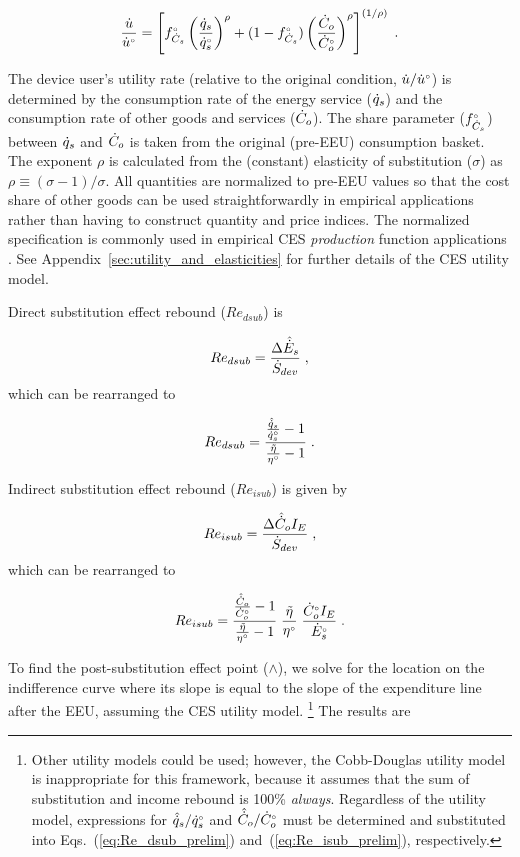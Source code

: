 \documentclass[12pt]{article}\usepackage[]{graphicx}\usepackage[]{xcolor}
\begin{document}
\begin{equation} \label{eq:ces_utility}
  \frac{\dot{u}}{{}{\dot{u}}^{\scriptscriptstyle \circ}} = \left[ {}{f}^{\scriptscriptstyle \circ}_{\dot{C}_s} \left( \frac{\dot{q}_s}{{}{\dot{q}}^{\scriptscriptstyle \circ}_s} \right)^\rho + (1-{}{f}^{\scriptscriptstyle \circ}_{\dot{C}_s}) \left( \frac{\dot{C}_o}{{}{\dot{C}}^{\scriptscriptstyle \circ}_o} \right)^\rho \right]^{(1/\rho)}{} \; .
\end{equation}

The device user's utility rate
(relative to the original condition, $\dot{u}/{}{\dot{u}}^{\scriptscriptstyle \circ}$)
is determined by
the consumption rate of the energy service ($\dot{q}_s$) and
the consumption rate of other goods and services ($\dot{C}_o$).
The share parameter (${}{f}^{\scriptscriptstyle \circ}_{\dot{C}_s}$) 
between $\dot{q}_s$ and $\dot{C}_o$
is taken from the original (pre-EEU) consumption basket.
The exponent $\rho$ is calculated from the (constant) 
elasticity of substitution ($\sigma$) 
as $\rho \equiv (\sigma - 1)/\sigma$.
All quantities are normalized to pre-EEU values so that
the cost share of other goods can be used straightforwardly 
in empirical applications rather than having
to construct quantity and price indices.
The normalized specification is commonly used in empirical CES \emph{production}
function applications \citep{Klump2012,Temple2012,Gechert2021}.
See Appendix~\ref{sec:utility_and_elasticities}
for further details of the CES utility model.

Direct substitution effect rebound ($Re_{dsub}$) is

\begin{equation} \label{eq:Re_dsub_def}
  Re_{dsub} = \frac{\Delta \hat{\dot{E}}_s}{\dot{S}_{dev}} \; ,
\end{equation}
%
which can be rearranged to

\begin{equation} \label{eq:Re_dsub_prelim}
  Re_{dsub} = \frac{\frac{\hat{\dot{q}}_s}{{}{\dot{q}}^{\scriptscriptstyle \circ}_s} - 1}{\frac{\tilde{\eta}}{{}{\eta}^{\scriptscriptstyle \circ}} - 1} \; .
\end{equation}

Indirect substitution effect rebound ($Re_{isub}$) is given by

\begin{equation} \label{eq:Re_isub_def}
  Re_{isub} = \frac{\Delta \hat{\dot{C}}_o I_E}{\dot{S}_{dev}} \; ,
\end{equation}
%
which can be rearranged to 

\begin{equation} \label{eq:Re_isub_prelim}
  Re_{isub} = \frac{\frac{\hat{\dot{C}}_o}{{}{\dot{C}}^{\scriptscriptstyle \circ}_o} - 1}{\frac{\tilde{\eta}}{{}{\eta}^{\scriptscriptstyle \circ}} - 1} \; 
                          \frac{\tilde{\eta}}{{}{\eta}^{\scriptscriptstyle \circ}} \; 
                          \frac{{}{\dot{C}}^{\scriptscriptstyle \circ}_o I_E}{{}{\dot{E}}^{\scriptscriptstyle \circ}_s} \; .
\end{equation}

To find the post-substitution effect point ($\wedge$),
we solve for the location on the indifference curve
where its slope is equal to the slope of the
expenditure line after the EEU, 
assuming the CES utility model.%
\footnote{
  Other utility models could be used; however, 
  the Cobb-Douglas utility model is inappropriate for this framework, 
  because it assumes that the sum 
  of substitution and income rebound is 100\% \emph{always}.
  Regardless of the utility model, expressions for
  $\hat{\dot{q}}_s/{}{\dot{q}}^{\scriptscriptstyle \circ}_s$ and
  $\hat{\dot{C}}_o/{}{\dot{C}}^{\scriptscriptstyle \circ}_o$
  must be determined
  and substituted into Eqs.~(\ref{eq:Re_dsub_prelim}) and~(\ref{eq:Re_isub_prelim}), 
  respectively.
}
%
The results are
\end{document}
